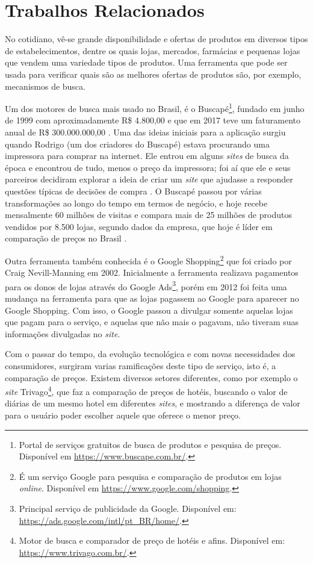 \section{Trabalhos Relacionados}
\label{sec:trabalhos-relacionados}

No cotidiano, vê-se grande disponibilidade e ofertas de produtos em diversos tipos de estabelecimentos, dentre os quais lojas, mercados, farmácias e pequenas lojas que vendem uma variedade tipos de produtos. Uma ferramenta que pode ser usada para verificar quais são as melhores ofertas de produtos são, por exemplo, mecanismos de busca.

Um dos motores de busca mais usado no Brasil, é o Buscapé\footnote{Portal de serviços gratuitos de busca de produtos e pesquisa de preços. Disponível em \url{https://www.buscape.com.br/}.}, fundado em junho de 1999 com aproximadamente R\$ 4.800,00 e que em 2017 teve um faturamento anual de R\$ 300.000.000,00 \cite{EmídiaFelipe2017BUSCAPÉ}. Uma das ideias iniciais para a aplicação surgiu quando Rodrigo (um dos criadores do Buscapé) estava procurando uma impressora para comprar na internet. Ele entrou em alguns \textit{sites} de busca da época e encontrou de tudo, menos o preço da impressora; foi aí que ele e seus parceiros decidiram explorar a ideia de criar um \textit{site} que ajudasse a responder questões típicas de decisões de compra \cite{Arruda2011Buscapé}. O Buscapé passou por várias transformações ao longo do tempo em termos de negócio, e hoje recebe mensalmente 60 milhões de visitas e compara mais de 25 milhões de produtos vendidos por 8.500 lojas, segundo dados da empresa, que hoje é líder em comparação de preços no Brasil \cite{Heloísa2017Startups}.

Outra ferramenta também conhecida é o Google Shopping\footnote{É um serviço Google para pesquisa e comparação de produtos em lojas \textit{online}. Disponível em \url{https://www.google.com/shopping}.} que foi criado por Craig Nevill-Manning em 2002. Inicialmente a ferramenta realizava pagamentos para os donos de lojas através do Google Ads\footnote{Principal serviço de publicidade da Google. Disponível em: \url{https://ads.google.com/intl/pt_BR/home/}.}, porém em 2012 foi feita uma mudança na ferramenta para que as lojas pagassem ao Google para aparecer no Google Shopping. Com isso, o Google passou a divulgar somente aquelas lojas que pagam para o serviço, e aquelas que não mais o pagavam, não tiveram suas informações divulgadas no \textit{site}.

Com o passar do tempo, da evolução tecnológica e com novas necessidades dos consumidores, surgiram varias ramificações deste tipo de serviço, isto é, a comparação de preços. Existem diversos setores diferentes, como por exemplo o \textit{site} Trivago\footnote{Motor de busca e comparador de preço de hotéis e afins. Disponível em: \url{https://www.trivago.com.br/}.}, que faz a comparação de preços de hotéis, buscando o valor de diárias de um mesmo hotel em diferentes \textit{sites}, e mostrando a diferença de valor para o usuário poder escolher aquele que oferece o menor preço.

